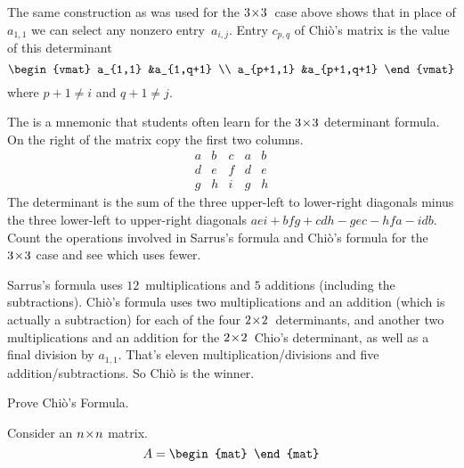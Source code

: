 \begin{exercises}
    \begin{answer}
      The same construction as was used for the $3 \! \times \! 3$~case above shows
      that in place of $a_{1,1}$ we can select any nonzero entry~$a_{i,j}$.
      Entry $c_{p,q}$ of Chi\`o's matrix is the value of this determinant
      \begin{equation*}
        \begin{vmat}
          a_{1,1}    &a_{1,q+1} \\
          a_{p+1,1}  &a_{p+1,q+1}
        \end{vmat}
      \end{equation*}
      where $p+1\neq i$ and $q+1\neq j$.
    \end{answer}
  \item The 
    is a mnemonic that students often learn 
    for the $3 \! \times \! 3$ determinant formula.
    On the right of the matrix copy the first two columns. 
    \begin{equation*}
      \begin{array}{ccc|cc}
        a &b &c &a &b \\
        d &e &f &d &e \\
        g &h &i &g &h
      \end{array}
    \end{equation*}
    The determinant is the sum of the
    three upper-left to lower-right diagonals minus the
    three lower-left to upper-right diagonals
    $aei+bfg+cdh-gec-hfa-idb$.
   Count the operations involved in Sarrus's formula and 
   Chi\`o's formula for the $3 \! \times \! 3$ case and see which uses fewer.
   \begin{answer}
     Sarrus's formula uses $12$~multiplications and $5$ additions (including
     the subtractions).
     Chi\`o's formula uses two multiplications and an addition
     (which is actually a subtraction)
     for each of the four $2 \! \times \! 2$~determinants, and another two
     multiplications and an addition for the $2 \! \times \! 2$~Chio's determinant, as
     well as a final division by $a_{1,1}$.
     That's eleven multiplication/divisions and five addition/subtractions.
     So Chi\`o is the winner.
   \end{answer}
  \item Prove Chi\`o's Formula.
    \begin{answer}
      Consider an $n \! \times \! n$ matrix.
      \begin{equation*}
        A=
        \begin{mat}

\end{mat}
\end{equation*}
\end{answer}
\end{exercises}
